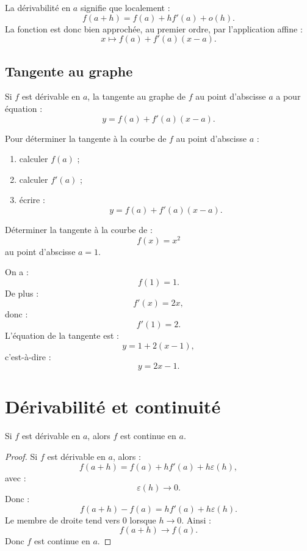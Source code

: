\documentclass[11pt,a4paper]{article}
\begin{document}
\begin{retenirbox}
La dérivabilité en \(a\) signifie que localement :
\[
f(a+h)=f(a)+hf'(a)+o(h).
\]
La fonction est donc bien approchée, au premier ordre, par l'application affine :
\[
x\mapsto f(a)+f'(a)(x-a).
\]
\end{retenirbox}

\subsection{Tangente au graphe}

Si \(f\) est dérivable en \(a\), la tangente au graphe de \(f\) au point d'abscisse \(a\) a pour équation :
\[
y=f(a)+f'(a)(x-a).
\]

\begin{methodbox}
Pour déterminer la tangente à la courbe de \(f\) au point d'abscisse \(a\) :
\begin{enumerate}
    \item calculer \(f(a)\) ;
    \item calculer \(f'(a)\) ;
    \item écrire :
    \[
    y=f(a)+f'(a)(x-a).
    \]
\end{enumerate}
\end{methodbox}

\begin{exercicebox}[Tangente]
Déterminer la tangente à la courbe de :
\[
f(x)=x^2
\]
au point d'abscisse \(a=1\).
\end{exercicebox}

\begin{correctionbox}
On a :
\[
f(1)=1.
\]
De plus :
\[
f'(x)=2x,
\]
donc :
\[
f'(1)=2.
\]
L'équation de la tangente est :
\[
y=1+2(x-1),
\]
c'est-à-dire :
\[
y=2x-1.
\]
\end{correctionbox}

\section{Dérivabilité et continuité}

\begin{theorembox}
Si \(f\) est dérivable en \(a\), alors \(f\) est continue en \(a\).
\end{theorembox}

\begin{proof}
Si \(f\) est dérivable en \(a\), alors :
\[
f(a+h)=f(a)+hf'(a)+h\varepsilon(h),
\]
avec :
\[
\varepsilon(h)\to0.
\]
Donc :
\[
f(a+h)-f(a)=hf'(a)+h\varepsilon(h).
\]
Le membre de droite tend vers \(0\) lorsque \(h\to0\).  
Ainsi :
\[
f(a+h)\to f(a).
\]
Donc \(f\) est continue en \(a\).
\end{proof}
\end{document}
